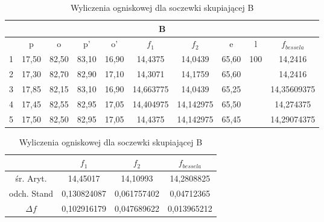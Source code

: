 \documentclass{article}
\begin{document}
\begin{table}[!ht]
    \centering
    \begin{tabular}{|c|c|c|c|c|c|c|c|c|c|}
    \hline
        \multicolumn{10}{|c|}{B} \\ \hline
         & p & o & p' & o' & $f_1$ & $f_2$ & e & l & $f_{bessela}$ \\ \hline
        1 & 17,50 & 82,50 & 83,10 & 16,90 & 14,4375 & 14,0439 & 65,60 & \multirow{5}{*}{100} & 14,2416 \\ \cline{1-8} \cline{10-10}
        2 & 17,30 & 82,70 & 82,90 & 17,10 & 14,3071 & 14,1759 & 65,60 &  & 14,2416 \\ \cline{1-8} \cline{10-10}
        3 & 17,85 & 82,15 & 83,10 & 16,90 & 14,663775 & 14,0439 & 65,25 &  & 14,35609375 \\ \cline{1-8} \cline{10-10}
        4 & 17,45 & 82,55 & 82,95 & 17,05 & 14,404975 & 14,142975 & 65,50 &  & 14,274375 \\ \cline{1-8} \cline{10-10}
        5 & 17,50 & 82,50 & 82,95 & 17,05 & 14,4375 & 14,142975 & 65,45 &  & 14,29074375 \\ \hline
    \end{tabular}

    \begin{tabular}{|c|c|c|c|}
    \hline
        &$f_1$ & $f_2$ & $f_{bessela}$ \\ \hline
        śr. Aryt. & 14,45017 & 14,10993 & 14,2808825 \\ \hline
        odch. Stand & 0,130824087 & 0,061757402 & 0,04712365 \\ \hline
        $\Delta f$ & 0,102916179 & 0,047689622 & 0,013965212 \\ \hline
    \end{tabular}
   \caption{Wyliczenia ogniskowej dla soczewki skupiającej B}
    \label{tab:Wyl_2}
\end{table}
\end{document}

